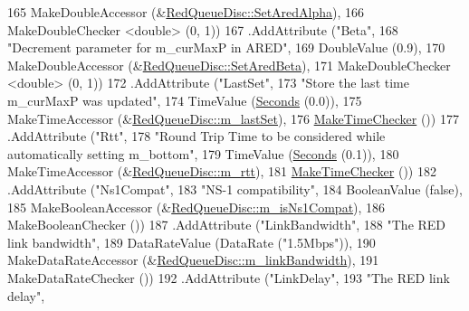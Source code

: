 \begin{DoxyCode}
165                    MakeDoubleAccessor (&\hyperlink{classns3_1_1RedQueueDisc_a8fb1a23699ad8fcc955b58c5988bc949}{RedQueueDisc::SetAredAlpha}),
166                    MakeDoubleChecker <double> (0, 1))
167     .AddAttribute (\textcolor{stringliteral}{"Beta"},
168                    \textcolor{stringliteral}{"Decrement parameter for m\_curMaxP in ARED"},
169                    DoubleValue (0.9),
170                    MakeDoubleAccessor (&\hyperlink{classns3_1_1RedQueueDisc_a1afbf8c26f597bd39328710e393de5f1}{RedQueueDisc::SetAredBeta}),
171                    MakeDoubleChecker <double> (0, 1))
172     .AddAttribute (\textcolor{stringliteral}{"LastSet"},
173                    \textcolor{stringliteral}{"Store the last time m\_curMaxP was updated"},
174                    TimeValue (\hyperlink{group__timecivil_ga33c34b816f8ff6628e33d5c8e9713b9e}{Seconds} (0.0)),
175                    MakeTimeAccessor (&\hyperlink{classns3_1_1RedQueueDisc_a9ccc3f308a4f15ae970499e7545b360f}{RedQueueDisc::m\_lastSet}),
176                    \hyperlink{group__time_ga7032965bd4afa578691d88c09e4481c1}{MakeTimeChecker} ())
177     .AddAttribute (\textcolor{stringliteral}{"Rtt"},
178                    \textcolor{stringliteral}{"Round Trip Time to be considered while automatically setting m\_bottom"},
179                    TimeValue (\hyperlink{group__timecivil_ga33c34b816f8ff6628e33d5c8e9713b9e}{Seconds} (0.1)),
180                    MakeTimeAccessor (&\hyperlink{classns3_1_1RedQueueDisc_a0944decd57a23297aaa1fa0d4cbb0e7b}{RedQueueDisc::m\_rtt}),
181                    \hyperlink{group__time_ga7032965bd4afa578691d88c09e4481c1}{MakeTimeChecker} ())
182     .AddAttribute (\textcolor{stringliteral}{"Ns1Compat"},
183                    \textcolor{stringliteral}{"NS-1 compatibility"},
184                    BooleanValue (\textcolor{keyword}{false}),
185                    MakeBooleanAccessor (&\hyperlink{classns3_1_1RedQueueDisc_a9586d035322ac6e72918bc884a5b017e}{RedQueueDisc::m\_isNs1Compat}),
186                    MakeBooleanChecker ())
187     .AddAttribute (\textcolor{stringliteral}{"LinkBandwidth"}, 
188                    \textcolor{stringliteral}{"The RED link bandwidth"},
189                    DataRateValue (DataRate (\textcolor{stringliteral}{"1.5Mbps"})),
190                    MakeDataRateAccessor (&\hyperlink{classns3_1_1RedQueueDisc_a036e8100b2bc17d9b7c3bf5184126f95}{RedQueueDisc::m\_linkBandwidth}),
191                    MakeDataRateChecker ())
192     .AddAttribute (\textcolor{stringliteral}{"LinkDelay"}, 
193                    \textcolor{stringliteral}{"The RED link delay"},

\end{DoxyCode}
